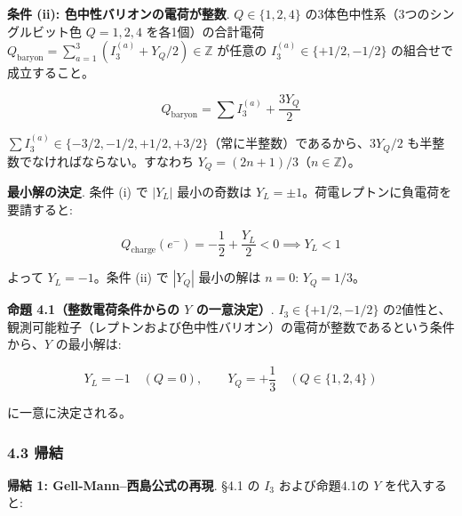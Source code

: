 \documentclass[
  a4paper,11pt]{ltjsarticle}
\begin{document}
\textbf{条件 (ii): 色中性バリオンの電荷が整数}. \(Q \in \{1,2,4\}\)
の3体色中性系（3つのシングルビット色 \(Q = 1, 2, 4\) を各1個）の合計電荷
\(Q_{\text{baryon}} = \sum_{a=1}^{3}(I_3^{(a)} + Y_Q / 2) \in \mathbb{Z}\)
が任意の \(I_3^{(a)} \in \{+1/2, -1/2\}\) の組合せで成立すること。

\[Q_{\text{baryon}} = \sum I_3^{(a)} + \frac{3 Y_Q}{2}\]

\(\sum I_3^{(a)} \in \{-3/2, -1/2, +1/2, +3/2\}\)（常に半整数）であるから、\(3 Y_Q / 2\)
も半整数でなければならない。すなわち
\(Y_Q = (2n+1)/3\)（\(n \in \mathbb{Z}\)）。

\textbf{最小解の決定}. 条件 (i) で \(|Y_L|\) 最小の奇数は
\(Y_L = \pm 1\)。荷電レプトンに負電荷を要請すると:

\[Q_{\text{charge}}(e^-) = -\frac{1}{2} + \frac{Y_L}{2} < 0 \implies Y_L < 1\]

よって \(Y_L = -1\)。条件 (ii) で \(|Y_Q|\) 最小の解は \(n = 0\):
\(Y_Q = 1/3\)。

\textbf{命題 4.1（整数電荷条件からの \(Y\) の一意決定）}.
\(I_3 \in \{+1/2, -1/2\}\)
の2値性と、観測可能粒子（レプトンおよび色中性バリオン）の電荷が整数であるという条件から、\(Y\)
の最小解は:

\[Y_L = -1 \quad (Q = 0), \qquad Y_Q = +\frac{1}{3} \quad (Q \in \{1,2,4\})\]

に一意に決定される。

\subsubsection{4.3 帰結}\label{ux5e30ux7d50}

\textbf{帰結 1: Gell-Mann--西島公式の再現}. §4.1 の \(I_3\)
および命題4.1の \(Y\) を代入すると:
\end{document}
